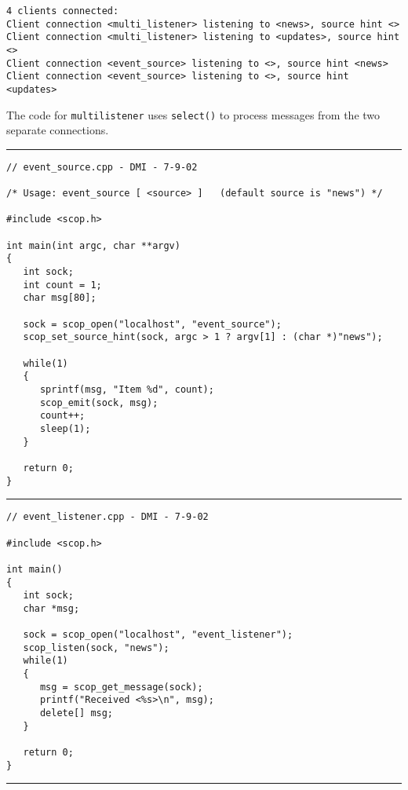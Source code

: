 \documentclass[12pt,a4paper,twoside]{article}
\renewcommand{\_}{\texttt{\symbol{95}}}
\newcommand{\codebar}{\rule{\textwidth}{0.3mm}}
\begin{document}
\begin{verbatim}
4 clients connected:
Client connection <multi_listener> listening to <news>, source hint <>
Client connection <multi_listener> listening to <updates>, source hint <>
Client connection <event_source> listening to <>, source hint <news>
Client connection <event_source> listening to <>, source hint <updates>
\end{verbatim}

The code for \texttt{multi\_listener} uses \texttt{select()} to
process messages from the two separate connections.

\codebar
\small
\begin{verbatim}
// event_source.cpp - DMI - 7-9-02

/* Usage: event_source [ <source> ]   (default source is "news") */

#include <scop.h>

int main(int argc, char **argv)
{
   int sock;
   int count = 1;
   char msg[80];
   
   sock = scop_open("localhost", "event_source");
   scop_set_source_hint(sock, argc > 1 ? argv[1] : (char *)"news");
   
   while(1)
   {
      sprintf(msg, "Item %d", count);
      scop_emit(sock, msg);
      count++;
      sleep(1);
   }
   
   return 0;
}
\end{verbatim}
\normalsize
\codebar
\small
\begin{verbatim}
// event_listener.cpp - DMI - 7-9-02

#include <scop.h>

int main()
{
   int sock;
   char *msg;
   
   sock = scop_open("localhost", "event_listener");
   scop_listen(sock, "news");
   while(1)
   {
      msg = scop_get_message(sock);
      printf("Received <%s>\n", msg);
      delete[] msg;
   }
   
   return 0;
}
\end{verbatim}
\normalsize
\codebar
\small
\end{document}
